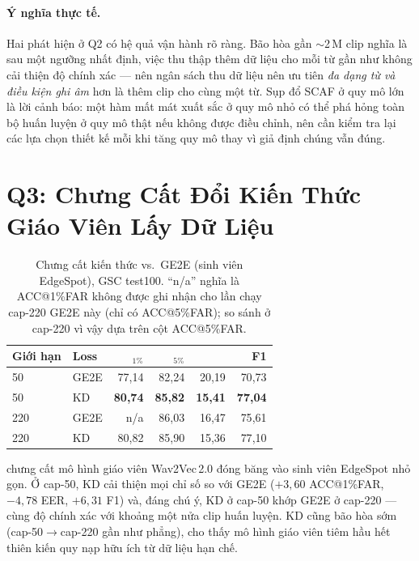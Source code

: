 \documentclass[12pt,a4paper]{report}
\newcommand{\acc}{\text{ACC}}
\newcommand{\eer}{\text{EER}}
\newcommand{\best}[1]{\textbf{#1}}
\begin{document}
\paragraph{Ý nghĩa thực tế.} Hai phát hiện ở Q2 có hệ quả vận hành rõ ràng. Bão hòa
gần $\sim$2\,M clip nghĩa là sau một ngưỡng nhất định, việc thu thập thêm dữ liệu
cho mỗi từ gần như không cải thiện độ chính xác --- nên ngân sách thu dữ liệu nên
ưu tiên \emph{đa dạng từ và điều kiện ghi âm} hơn là thêm clip cho cùng một từ. Sụp
đổ SCAF ở quy mô lớn là lời cảnh báo: một hàm mất mát xuất sắc ở quy mô nhỏ có thể
phá hỏng toàn bộ huấn luyện ở quy mô thật nếu không được điều chỉnh, nên cần kiểm
tra lại các lựa chọn thiết kế mỗi khi tăng quy mô thay vì giả định chúng vẫn đúng.

\section{Q3: Chưng Cất Đổi Kiến Thức Giáo Viên Lấy Dữ Liệu}\label{sec:res-q3}

\begin{table}[H]
\centering
\caption{Chưng cất kiến thức vs.\ GE2E (sinh viên EdgeSpot), GSC test100.
``n/a'' nghĩa là ACC@1\%FAR không được ghi nhận cho lần chạy cap-220 GE2E này (chỉ
có ACC@5\%FAR); so sánh ở cap-220 vì vậy dựa trên cột ACC@5\%FAR.}
\label{tab:kd}
\small
\begin{tabular}{l l r r r r}
\toprule
\textbf{Giới hạn} & \textbf{Loss} & \acc$_{1\%}$ & \acc$_{5\%}$ & \eer & F1\\
\midrule
50  & GE2E & 77{,}14 & 82{,}24 & 20{,}19 & 70{,}73 \\
\rowcolor{blue!7}
50  & KD   & \best{80{,}74} & \best{85{,}82} & \best{15{,}41} & \best{77{,}04} \\
220 & GE2E & n/a & 86{,}03 & 16{,}47 & 75{,}61 \\
220 & KD   & 80{,}82 & 85{,}90 & 15{,}36 & 77{,}10 \\
\bottomrule
\end{tabular}
\end{table}

 chưng cất mô hình giáo viên Wav2Vec\,2.0 đóng băng vào sinh viên
EdgeSpot nhỏ gọn. Ở cap-50, KD cải thiện mọi chỉ số so với GE2E ($+3{,}60$
ACC@1\%FAR, $-4{,}78$ EER, $+6{,}31$ F1) và, đáng chú ý, KD ở cap-50 khớp GE2E
ở cap-220 --- cùng độ chính xác với khoảng một nửa clip huấn luyện. KD cũng bão
hòa sớm (cap-50$\to$cap-220 gần như phẳng), cho thấy mô hình giáo viên tiêm hầu
hết thiên kiến quy nạp hữu ích từ dữ liệu hạn chế.
\end{document}
